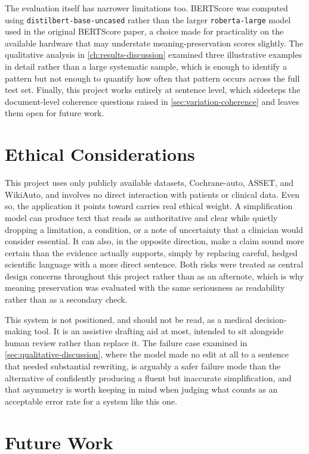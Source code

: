 The evaluation itself has narrower limitations too. BERTScore was computed using \texttt{distilbert-base-uncased} rather than the larger \texttt{roberta-large} model used in the original BERTScore paper, a choice made for practicality on the available hardware that may understate meaning-preservation scores slightly. The qualitative analysis in \cref{ch:results-discussion} examined three illustrative examples in detail rather than a large systematic sample, which is enough to identify a pattern but not enough to quantify how often that pattern occurs across the full test set. Finally, this project works entirely at sentence level, which sidesteps the document-level coherence questions raised in \cref{sec:variation-coherence} and leaves them open for future work.

\section{Ethical Considerations}
\label{sec:ethics}

This project uses only publicly available datasets, Cochrane-auto, ASSET, and WikiAuto, and involves no direct interaction with patients or clinical data. Even so, the application it points toward carries real ethical weight. A simplification model can produce text that reads as authoritative and clear while quietly dropping a limitation, a condition, or a note of uncertainty that a clinician would consider essential. It can also, in the opposite direction, make a claim sound more certain than the evidence actually supports, simply by replacing careful, hedged scientific language with a more direct sentence. Both risks were treated as central design concerns throughout this project rather than as an afternote, which is why meaning preservation was evaluated with the same seriousness as readability rather than as a secondary check.

This system is not positioned, and should not be read, as a medical decision-making tool. It is an assistive drafting aid at most, intended to sit alongside human review rather than replace it. The failure case examined in \cref{sec:qualitative-discussion}, where the model made no edit at all to a sentence that needed substantial rewriting, is arguably a safer failure mode than the alternative of confidently producing a fluent but inaccurate simplification, and that asymmetry is worth keeping in mind when judging what counts as an acceptable error rate for a system like this one.

\section{Future Work}
\label{sec:future-work}


